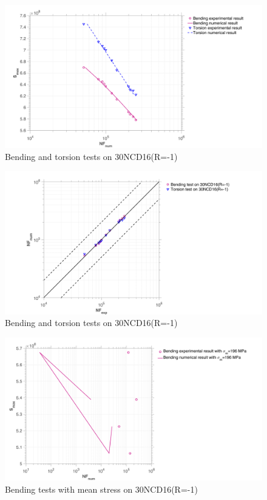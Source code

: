 \documentclass[3p,times,number,review]{elsarticle}
\begin{document}
\begin{figure}[!h]
	\centering
	\includegraphics[width=\textwidth]{figures//bt1D_30NCD16_sn.png} 
	\caption{Bending and torsion tests on 30NCD16(R=-1)}
	\label{fig.bt1D30NCD16sn}
\end{figure}
\begin{figure}[!h]
	\centering
	\includegraphics[width=\textwidth]{figures//bt1D_30NCD16_err1.png} 
	\caption{Bending and torsion tests on 30NCD16(R=-1)}
	\label{fig.bt1D30NCD16err1}
\end{figure}
\begin{figure}[!h]
	\centering
	\includegraphics[width=\textwidth]{figures//b1D_m_30NCD16_sn.png} 
	\caption{Bending tests with mean stress on 30NCD16(R=-1)}
	\label{fig.b1Dm30NCD16sn}
\end{figure}
\end{document}
